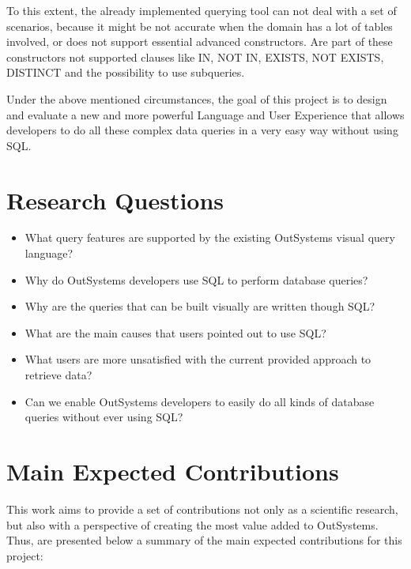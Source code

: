 To this extent, the already implemented querying tool can not deal with a set of scenarios, because it might be not accurate when the domain has a lot of tables involved, or does not support essential advanced constructors. Are part of these constructors not supported clauses like IN, NOT IN, EXISTS, NOT EXISTS, DISTINCT and the possibility to use subqueries.

Under the above mentioned circumstances, the goal of this project is to design and evaluate a new and more powerful Language and User Experience that allows developers to do all these complex data queries in a very easy way without using SQL.

\section{Research Questions}
\label{sec:research_questions}
\begin{itemize}
  \item What query features are supported by the existing OutSystems visual query language?
  \item Why do OutSystems developers use SQL to perform database queries?
  \item Why are the queries that can be built visually are written though SQL?
  \item What are the main causes that users pointed out to use SQL?
  \item What users are more unsatisfied with the current provided approach to retrieve data?
  \item Can we enable OutSystems developers to easily do all kinds of database queries without ever using SQL?
\end{itemize}

\section{Main Expected Contributions}
\label{sec:main_exp_contributions}
This work aims to provide a set of contributions not only as a scientific research, but also with a perspective of creating the most value added to OutSystems. Thus, are presented below a summary of the main expected contributions for this project:


